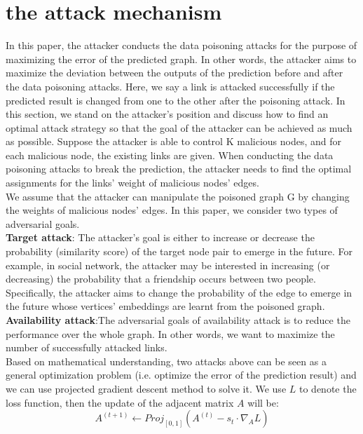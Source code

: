 \documentclass{acmtog} %
\begin{document}
\section{the attack mechanism}
In this paper, the attacker conducts the data poisoning attacks for the purpose of maximizing the error of the predicted graph. In other words, the attacker aims to maximize the deviation between the outputs of the prediction before and after the data poisoning attacks. Here, we say a link is attacked successfully if the predicted result is changed from one to the other after the poisoning attack. In this section, we stand on the attacker’s position and discuss how to find an optimal attack strategy so that the goal of the attacker can be achieved as much as possible.
Suppose the attacker is able to control K malicious nodes, and for each malicious node, the existing links are given.
When conducting the data poisoning attacks to break the prediction, the attacker needs to find the optimal assignments for the links’ weight of malicious nodes' edges. \\
\indent We assume that the attacker can manipulate the poisoned graph G by changing the weights of malicious nodes' edges. In this paper, we consider two types of adversarial goals.\\
{\bfseries Target attack}: The attacker's goal is either to increase or decrease the probability (similarity score) of the target node pair to emerge in the future. For example, in social network, the attacker may be interested in increasing (or decreasing) the probability that a friendship occurs between two people. Specifically, the attacker aims to change the probability of the edge to emerge in the future
whose vertices' embeddings are learnt from the poisoned graph.\\
{\bfseries Availability attack}:The adversarial goals of availability attack is to reduce the performance over the whole graph. In other words, we want to maximize the number of successfully attacked links. \\
\indent Based on mathematical understanding, two attacks above can be seen as a general optimization problem (i.e. optimize the error of the prediction result) and we can use projected gradient descent method to solve it. We use $L$ to denote the loss function, then the update of the adjacent matrix $A$ will be:
\begin{equation}
A ^ { ( t + 1 ) } \leftarrow { Proj } _ { [ 0,1 ] } \left( A ^ {( t ) } - s _ { t } \cdot \nabla _ { A } L \right)
\end{equation}
\end{document}
